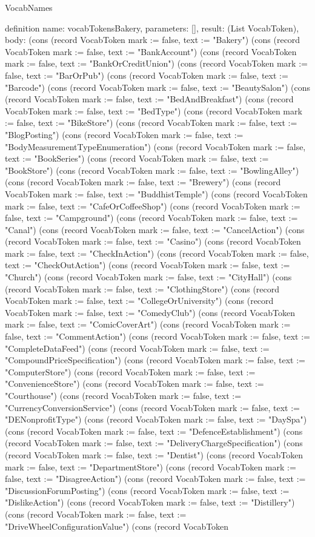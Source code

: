 \begin{lexlean}{VocabNames}
\begin{semanticmodule}
definition{
  name: vocabTokensBakery,
  parameters: [],
  result: (List VocabToken),
  body: (cons (record VocabToken {mark := false, text := "Bakery"}) (cons (record VocabToken {mark := false, text := "BankAccount"}) (cons (record VocabToken {mark := false, text := "BankOrCreditUnion"}) (cons (record VocabToken {mark := false, text := "BarOrPub"}) (cons (record VocabToken {mark := false, text := "Barcode"}) (cons (record VocabToken {mark := false, text := "BeautySalon"}) (cons (record VocabToken {mark := false, text := "BedAndBreakfast"}) (cons (record VocabToken {mark := false, text := "BedType"}) (cons (record VocabToken {mark := false, text := "BikeStore"}) (cons (record VocabToken {mark := false, text := "BlogPosting"}) (cons (record VocabToken {mark := false, text := "BodyMeasurementTypeEnumeration"}) (cons (record VocabToken {mark := false, text := "BookSeries"}) (cons (record VocabToken {mark := false, text := "BookStore"}) (cons (record VocabToken {mark := false, text := "BowlingAlley"}) (cons (record VocabToken {mark := false, text := "Brewery"}) (cons (record VocabToken {mark := false, text := "BuddhistTemple"}) (cons (record VocabToken {mark := false, text := "CafeOrCoffeeShop"}) (cons (record VocabToken {mark := false, text := "Campground"}) (cons (record VocabToken {mark := false, text := "Canal"}) (cons (record VocabToken {mark := false, text := "CancelAction"}) (cons (record VocabToken {mark := false, text := "Casino"}) (cons (record VocabToken {mark := false, text := "CheckInAction"}) (cons (record VocabToken {mark := false, text := "CheckOutAction"}) (cons (record VocabToken {mark := false, text := "Church"}) (cons (record VocabToken {mark := false, text := "CityHall"}) (cons (record VocabToken {mark := false, text := "ClothingStore"}) (cons (record VocabToken {mark := false, text := "CollegeOrUniversity"}) (cons (record VocabToken {mark := false, text := "ComedyClub"}) (cons (record VocabToken {mark := false, text := "ComicCoverArt"}) (cons (record VocabToken {mark := false, text := "CommentAction"}) (cons (record VocabToken {mark := false, text := "CompleteDataFeed"}) (cons (record VocabToken {mark := false, text := "CompoundPriceSpecification"}) (cons (record VocabToken {mark := false, text := "ComputerStore"}) (cons (record VocabToken {mark := false, text := "ConvenienceStore"}) (cons (record VocabToken {mark := false, text := "Courthouse"}) (cons (record VocabToken {mark := false, text := "CurrencyConversionService"}) (cons (record VocabToken {mark := false, text := "DENonprofitType"}) (cons (record VocabToken {mark := false, text := "DaySpa"}) (cons (record VocabToken {mark := false, text := "DefenceEstablishment"}) (cons (record VocabToken {mark := false, text := "DeliveryChargeSpecification"}) (cons (record VocabToken {mark := false, text := "Dentist"}) (cons (record VocabToken {mark := false, text := "DepartmentStore"}) (cons (record VocabToken {mark := false, text := "DisagreeAction"}) (cons (record VocabToken {mark := false, text := "DiscussionForumPosting"}) (cons (record VocabToken {mark := false, text := "DislikeAction"}) (cons (record VocabToken {mark := false, text := "Distillery"}) (cons (record VocabToken {mark := false, text := "DriveWheelConfigurationValue"}) (cons (record VocabToken }
\end{semanticmodule}
\end{lexlean}
